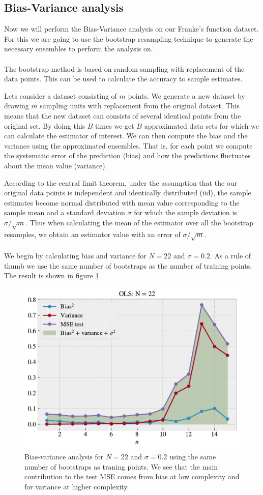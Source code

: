 \documentclass[norsk,a4paper,12pt]{scrartcl}
\begin{document}
\subsection{Bias-Variance analysis}
Now we will perform the Bias-Variance analysis on our Franke's function dataset. For this we are going to use the bootstrap resampling technique to generate the necessary ensembles to perform the analysis on. \\
\\
The bootstrap method is based on random sampling with replacement of the data points. This can be used to calculate the accuracy to sample estimates. \par 
Lets consider a dataset consisting of $m$ points. We generate a new dataset by drawing $m$ sampling units with replacement from the original dataset. This means that the new dataset can consists of several identical points from the original set. By doing this $B$ times we get $B$ approximated data sets for which we can calculate the estimator of interest.  We can then compute the bias and the variance using the approximated ensembles. That is, for each point we compute the systematic error of the prediction (bias) and how the predictions fluctuates about the mean value (variance). \par
According to the central limit theorem, under the assumption that the our original data points is independent and identically distributed (iid), the sample estimates become normal distributed with mean value corresponding to the sample mean and a standard deviation $\sigma$ for which the sample deviation is $\sigma/\sqrt{m}$. Thus when calculating the mean of the estimator over all the bootstrap resamples, we obtain an estimator value with an error of $\sigma/\sqrt{m}$. \\
\\
We begin by calculating bias and variance for $N = 22$ and $\sigma = 0.2$. As a rule of thumb we use the same number of bootstraps as the number of training points. The result is shown in figure \ref{fig:bias_var_OLS}.
\begin{figure}[H]
    \centering
    \includegraphics[width=0.8\linewidth]{figures/bias_variance_tradeoff_OLS.pdf}
    \caption{Bias-variance analysis for $N = 22$ and $\sigma = 0.2$ using the same number of bootstraps as traning points. We see that the main contribution to the test MSE comes from bias at low complexity and for variance at higher complexity.}
    \label{fig:bias_var_OLS}
\end{figure}
\end{document}
